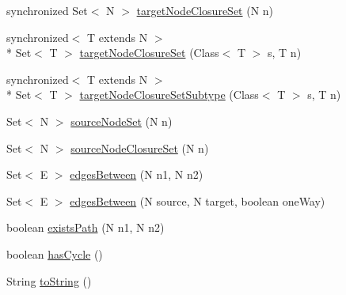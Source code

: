 \begin{DoxyCompactItemize}
\item 
synchronized Set$<$ N $>$ \hyperlink{classorg_1_1tzi_1_1use_1_1graph_1_1_directed_graph_base_3_01_n_00_01_e_01extends_01_directed_edge_3_01_n_01_4_01_4_a270f3d6b87a11b888dac312345ec102d}{target\-Node\-Closure\-Set} (N n)
\item 
synchronized$<$ T extends N $>$\\*
 Set$<$ T $>$ \hyperlink{classorg_1_1tzi_1_1use_1_1graph_1_1_directed_graph_base_3_01_n_00_01_e_01extends_01_directed_edge_3_01_n_01_4_01_4_a37144d743d68da1a9f1110dc0686992b}{target\-Node\-Closure\-Set} (Class$<$ T $>$ s, T n)
\item 
synchronized$<$ T extends N $>$\\*
 Set$<$ T $>$ \hyperlink{classorg_1_1tzi_1_1use_1_1graph_1_1_directed_graph_base_3_01_n_00_01_e_01extends_01_directed_edge_3_01_n_01_4_01_4_ae265d7502ece53b897e634bb9347fb10}{target\-Node\-Closure\-Set\-Subtype} (Class$<$ T $>$ s, T n)
\item 
Set$<$ N $>$ \hyperlink{classorg_1_1tzi_1_1use_1_1graph_1_1_directed_graph_base_3_01_n_00_01_e_01extends_01_directed_edge_3_01_n_01_4_01_4_aa0d8f1e394e0191aac19ae757d74f2da}{source\-Node\-Set} (N n)
\item 
Set$<$ N $>$ \hyperlink{classorg_1_1tzi_1_1use_1_1graph_1_1_directed_graph_base_3_01_n_00_01_e_01extends_01_directed_edge_3_01_n_01_4_01_4_a2b20a5c8e65f1d9741d598ee04b42736}{source\-Node\-Closure\-Set} (N n)
\item 
Set$<$ E $>$ \hyperlink{classorg_1_1tzi_1_1use_1_1graph_1_1_directed_graph_base_3_01_n_00_01_e_01extends_01_directed_edge_3_01_n_01_4_01_4_ac232b14756c2adebe9f77c57a3b96cc4}{edges\-Between} (N n1, N n2)
\item 
Set$<$ E $>$ \hyperlink{classorg_1_1tzi_1_1use_1_1graph_1_1_directed_graph_base_3_01_n_00_01_e_01extends_01_directed_edge_3_01_n_01_4_01_4_ab4c90d14f98f9adeb8a19dad73d80bb4}{edges\-Between} (N source, N target, boolean one\-Way)
\item 
boolean \hyperlink{classorg_1_1tzi_1_1use_1_1graph_1_1_directed_graph_base_3_01_n_00_01_e_01extends_01_directed_edge_3_01_n_01_4_01_4_a651c0ceaaf066562cb62aaa98f8a8e60}{exists\-Path} (N n1, N n2)
\item 
boolean \hyperlink{classorg_1_1tzi_1_1use_1_1graph_1_1_directed_graph_base_3_01_n_00_01_e_01extends_01_directed_edge_3_01_n_01_4_01_4_ac9783ab84e0634104d984323ef24a648}{has\-Cycle} ()
\item 
String \hyperlink{classorg_1_1tzi_1_1use_1_1graph_1_1_directed_graph_base_3_01_n_00_01_e_01extends_01_directed_edge_3_01_n_01_4_01_4_a307ad12ee9a06dca8b1e69cffc42b7ae}{to\-String} ()

\end{DoxyCompactItemize}
